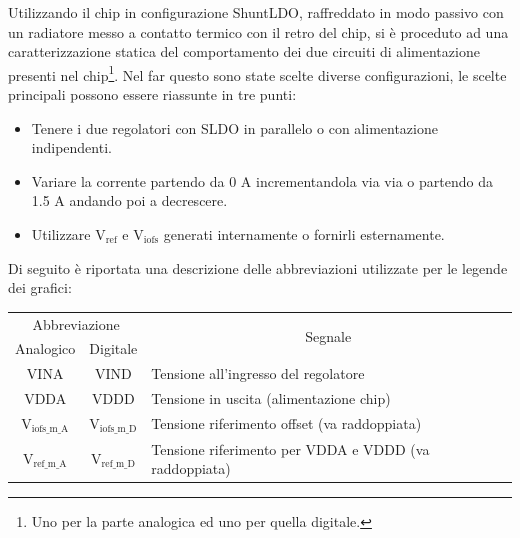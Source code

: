 Utilizzando il chip in configurazione ShuntLDO, raffreddato in modo passivo con un radiatore messo a contatto termico con il retro del chip, si è proceduto ad una caratterizzazione statica del comportamento dei due circuiti di alimentazione presenti nel chip\footnote{Uno per la parte analogica ed uno per quella digitale.}. 
Nel far questo sono state scelte diverse configurazioni, le scelte principali possono essere riassunte in tre punti:
\begin{itemize}
\item Tenere i due regolatori con SLDO in parallelo o con alimentazione indipendenti.
\item Variare la corrente partendo da 0 A incrementandola via via o partendo da 1.5 A andando poi a decrescere.
\item Utilizzare $\mathrm{V_{ref}}$ e $\mathrm{V_{iofs}}$ generati internamente o fornirli esternamente.
\end{itemize}

Di seguito è riportata una descrizione delle abbreviazioni utilizzate per le legende dei grafici:

\begin{center}
\begin{tabularx}{\linewidth}{|cc|X|}
\hline
\multicolumn{2}{|c|}{Abbreviazione} & \multicolumn{1}{c|}{\multirow{2}{*}{Segnale}}\\ 
Analogico & Digitale & \\
\hline
VINA & VIND & Tensione all'ingresso del regolatore  \\ \hline
VDDA & VDDD & Tensione in uscita (alimentazione chip) \\ \hline
$\mathrm{V_{iofs \_ m \_ A}}$ & $\mathrm{V_{iofs \_ m \_ D}}$ & Tensione riferimento offset (va raddoppiata) \\ \hline   
$\mathrm{V_{ref \_ m \_ A}}$ & $\mathrm{V_{ref \_ m \_ D}}$ & Tensione riferimento per VDDA e VDDD (va raddoppiata)\\ \hline   
\end{tabularx}
\end{center}

